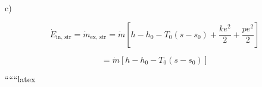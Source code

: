 c)

\[
\dot{E}_{\text{in, str}} = \dot{m}_{\text{ex, str}} = \dot{m} \left[ h - h_0 - T_0 (s - s_0) + \frac{ke^2}{2} + \frac{pe^2}{2} \right]
\]

\[
= \dot{m} \left[ h - h_0 - T_0 (s - s_0) \right]
\]

``````latex